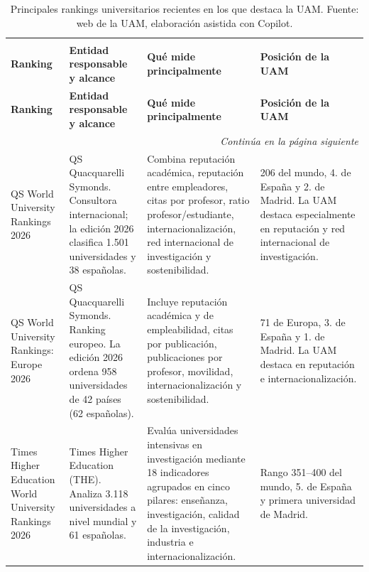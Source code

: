 \documentclass[
  11pt,
  a4paper,
  twoside]{scrreprt}
\begin{document}
\begin{landscape}

\begin{longtable}{p{3cm} p{5cm} p{8cm} p{6cm}}

\caption{\label{tbl-rankings-uam}Principales rankings universitarios recientes en los que destaca la UAM. Fuente: web de la UAM, elaboración asistida con Copilot.}

\tabularnewline

 \\

\textbf{Ranking} & \textbf{Entidad responsable y alcance} & \textbf{Qué mide principalmente} & \textbf{Posición de la UAM} \\
\hline
\endfirsthead

\textbf{Ranking} & \textbf{Entidad responsable y alcance} & \textbf{Qué mide principalmente} & \textbf{Posición de la UAM} \\
\hline
\endhead

\hline
\multicolumn{4}{r}{\textit{Continúa en la página siguiente}} \\
\endfoot

\hline
\endlastfoot

QS World University Rankings 2026
&
QS Quacquarelli Symonds. Consultora internacional; la edición 2026 clasifica 1.501 universidades y 38 españolas.
&
Combina reputación académica, reputación entre empleadores, citas por profesor, ratio profesor/estudiante, internacionalización, red internacional de investigación y sostenibilidad.
&
206 del mundo, 4.\textordfeminine{} de España y 2.\textordfeminine{} de Madrid. La UAM destaca especialmente en reputación y red internacional de investigación.
\\
\hline

QS World University Rankings: Europe 2026
&
QS Quacquarelli Symonds. Ranking europeo. La edición 2026 ordena 958 universidades de 42 países (62 españolas).
&
Incluye reputación académica y de empleabilidad, citas por publicación, publicaciones por profesor, movilidad, internacionalización y sostenibilidad.
&
71 de Europa, 3.\textordfeminine{} de España y 1.\textordfeminine{} de Madrid. La UAM destaca en reputación e internacionalización.
\\
\hline

Times Higher Education World University Rankings 2026
&
Times Higher Education (THE). Analiza 3.118 universidades a nivel mundial y 61 españolas.
&
Evalúa universidades intensivas en investigación mediante 18 indicadores agrupados en cinco pilares: enseñanza, investigación, calidad de la investigación, industria e internacionalización.
&
Rango 351--400 del mundo, 5.\textordfeminine{} de España y primera universidad de Madrid.
\\
\hline


\end{longtable}
\end{landscape}
\end{document}
